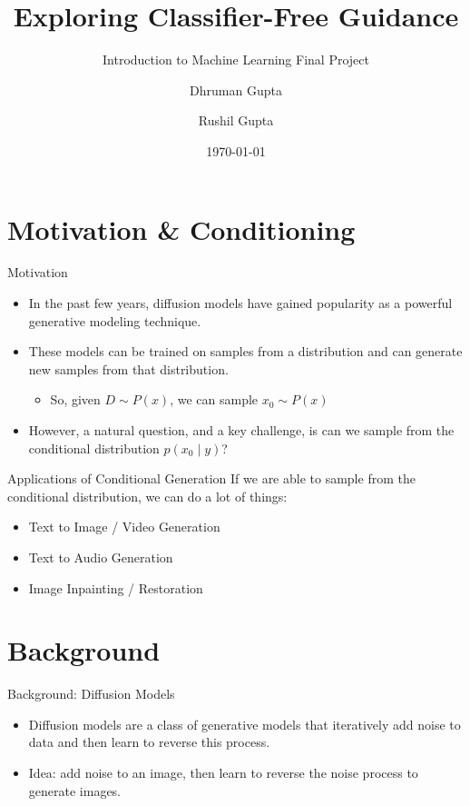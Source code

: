 \documentclass[11pt]{beamer}
\title{Exploring Classifier-Free Guidance}
\subtitle{Introduction to Machine Learning Final Project}
\author{Dhruman Gupta \and Rushil Gupta}
\date{\today}
\begin{document}
\begin{frame}
  \titlepage
\end{frame}



\section{Motivation \& Conditioning}
\begin{frame}{Motivation}
  \begin{itemize}
    \item In the past few years, diffusion models have gained popularity as a powerful generative modeling technique.
    \item These models can be trained on samples from a distribution and can generate new samples from that distribution.
    \begin{itemize}
      \item So, given $D \sim P(x)$, we can sample $x_0 \sim P(x)$
    \end{itemize}
    \item However, a natural question, and a key challenge, is can we sample from the conditional distribution $p(x_0\mid y)$?
  \end{itemize}
\end{frame}

\begin{frame}{Applications of Conditional Generation}
  If we are able to sample from the conditional distribution, we can do a lot of things:
  \begin{itemize}
    \item Text to Image / Video Generation
    \item Text to Audio Generation
    \item Image Inpainting / Restoration
  \end{itemize}
\end{frame}

\section{Background}
\begin{frame}{Background: Diffusion Models}
  \begin{itemize}
    \item Diffusion models are a class of generative models that iteratively add noise to data and then learn to reverse this process.
    \item Idea: add noise to an image, then learn to reverse the noise process to generate images.
  \end{itemize}
\end{frame}
\end{document}
